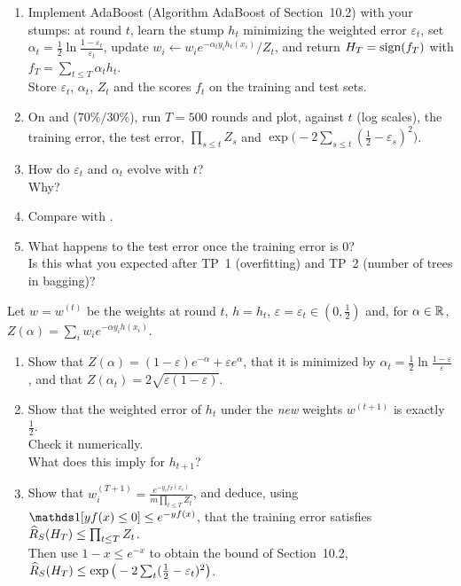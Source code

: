 \documentclass[a4paper,11pt]{article}
\begin{document}
\begin{enumerate}
\item Implement AdaBoost (Algorithm AdaBoost of Section~10.2) with your stumps: at round $t$, learn the stump $h_t$
      minimizing the weighted error $\varepsilon_t$, set $\alpha_t=\frac12\ln\frac{1-\varepsilon_t}{\varepsilon_t}$, update
      $w_i\leftarrow w_ie^{-\alpha_ty_ih_t(x_i)}/Z_t$, and return $H_T=\operatorname{sign}(f_T)$ with $f_T=\sum_{t\leq T}\alpha_th_t$.\\
      Store $\varepsilon_t$, $\alpha_t$, $Z_t$ and the scores $f_t$ on the training and test sets.
\item On  and  ($70\%/30\%$), run $T=500$ rounds and plot, against $t$ (log scales), the
      training error, the test error, $\prod_{s\leq t}Z_s$ and $\exp\big(-2\sum_{s\leq t}(\frac12-\varepsilon_s)^2\big)$.
\item How do $\varepsilon_t$ and $\alpha_t$ evolve with $t$?\\
      Why?
\item Compare with .
\item What happens to the test error once the training error is $0$?\\
      Is this what you expected after TP~1 (overfitting) and TP~2 (number of trees in bagging)?
\end{enumerate}

\label{p3:why}

Let $w=w^{(t)}$ be the weights at round $t$, $h=h_t$, $\varepsilon=\varepsilon_t\in(0,\frac12)$ and, for $\alpha\in\mathbb{R}$,
$Z(\alpha)=\sum_iw_ie^{-\alpha y_ih(x_i)}$.

\begin{enumerate}
\item Show that $Z(\alpha)=(1-\varepsilon)e^{-\alpha}+\varepsilon e^{\alpha}$, that it is minimized by
      $\alpha_t=\frac12\ln\frac{1-\varepsilon}{\varepsilon}$, and that $Z(\alpha_t)=2\sqrt{\varepsilon(1-\varepsilon)}$.
\item Show that the weighted error of $h_t$ under the \emph{new} weights $w^{(t+1)}$ is exactly $\frac12$.\\
      Check it
      numerically.\\
      What does this imply for $h_{t+1}$?
\item Show that $w^{(T+1)}_i=\frac{e^{-y_if_T(x_i)}}{m\prod_{t\leq T}Z_t}$, and deduce, using
      $\ind{yf(x)\leq0}\leq e^{-yf(x)}$, that the training error satisfies $\widehat{R}_{S}(H_T)\leq\prod_{t\leq T}Z_t$.\\
      Then use
      $1-x\leq e^{-x}$ to obtain the bound of Section~10.2, $\widehat{R}_{S}(H_T)\leq\exp\big(-2\sum_t(\frac12-\varepsilon_t)^2\big)$.
\end{enumerate}
\end{document}
